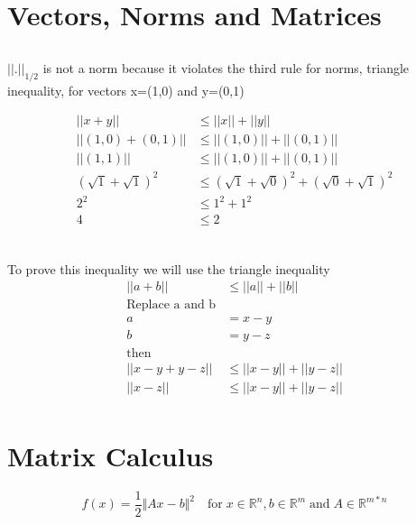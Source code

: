 \documentclass[12pt]{article}         %
\begin{document}
\section{Vectors, Norms and Matrices}


\subsection{}
$\vert$$\vert$.$\vert$$\vert_{1/2}$ is not a norm because it violates the third rule for norms, triangle inequality, for vectors x=(1,0) and y=(0,1)

$$
\begin{aligned}
||x+y||&\leq ||x|| + ||y||\\
||(1, 0) + (0, 1)||&\leq ||(1, 0)|| + ||(0, 1)||\\
||(1, 1)||&\leq ||(1, 0)|| + ||(0, 1)||\\
(\sqrt{1} + \sqrt{1})^2&\leq (\sqrt{1} + \sqrt{0})^2 + (\sqrt{0} + \sqrt{1})^2\\
2^2 &\leq 1^2 + 1^2\\
4 &\leq 2\\
\end{aligned}
$$

\subsection{}
To prove this inequality we will use the triangle inequality
$$
\begin{aligned}
||a + b||&\leq ||a|| + ||b||\\
\text{Replace a and b}\\ a &= x-y\\ b &= y-z\\ \text{then}\\
||x - y + y - z||&\leq ||x-y|| + ||y-z||\\
||x - z||&\leq ||x-y|| + ||y-z||\\
\end{aligned}
$$





\section{Matrix Calculus}

\begin{equation}
	f(x) = \dfrac{1}{2}\Vert Ax - b\Vert^2 \quad\text{for}\; x\in \mathbb{R} ^n ,b\in \mathbb{R}^m \;\text{and}\; A\in\mathbb{R}^{m*n}
\end{equation}
\end{document}
